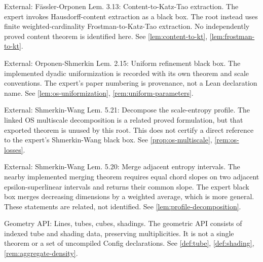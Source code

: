 \begin{remark}
\label{rem:atlas-XFO}
External: Fässler-Orponen Lem. 3.13: Content-to-Katz-Tao extraction.
The expert invokes Hausdorff-content extraction as a black box. The root instead uses finite weighted-cardinality Frostman-to-Katz-Tao extraction. No independently proved content theorem is identified here.
See \ref{lem:content-to-kt}, \ref{lem:frostman-to-kt}.
\end{remark}

\begin{remark}
\label{rem:atlas-XOSuniform}
External: Orponen-Shmerkin Lem. 2.15: Uniform refinement black box.
The implemented dyadic uniformization is recorded with its own theorem and scale conventions. The expert's paper numbering is provenance, not a Lean declaration name.
See \ref{lem:os-uniformization}, \ref{rem:uniform-parameters}.
\end{remark}

\begin{remark}
\label{rem:atlas-XSWdecomp}
External: Shmerkin-Wang Lem. 5.21: Decompose the scale-entropy profile.
The linked OS multiscale decomposition is a related proved formulation, but that exported theorem is unused by this root. This does not certify a direct reference to the expert's Shmerkin-Wang black box.
See \ref{prop:os-multiscale}, \ref{rem:os-losses}.
\end{remark}

\begin{remark}
\label{rem:atlas-XSWmerge}
External: Shmerkin-Wang Lem. 5.20: Merge adjacent entropy intervals.
The nearby implemented merging theorem requires equal chord slopes on two adjacent epsilon-superlinear intervals and returns their common slope. The expert black box merges decreasing dimensions by a weighted average, which is more general. These statements are related, not identified.
See \ref{lem:profile-decomposition}.
\end{remark}

\begin{remark}
\label{rem:atlas-Igeom}
Geometry API: Lines, tubes, cubes, shadings.
The geometric API consists of indexed tube and shading data, preserving multiplicities. It is not a single theorem or a set of uncompiled Config declarations.
See \ref{def:tube}, \ref{def:shading}, \ref{rem:aggregate-density}.
\end{remark}

